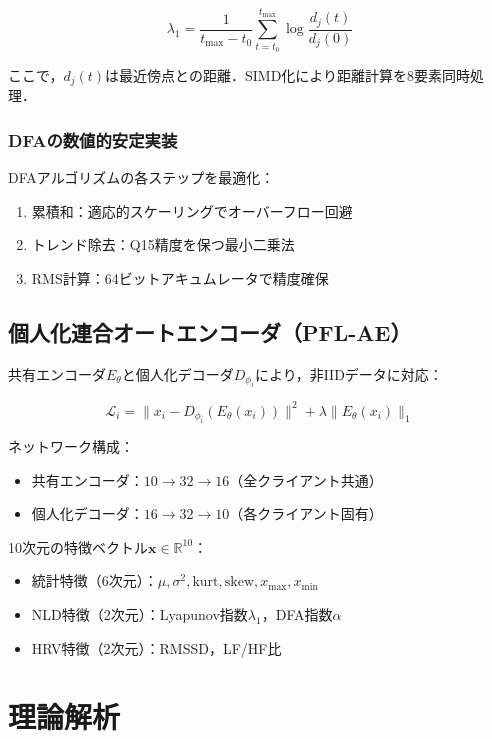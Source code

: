 \documentclass[10pt,twocolumn]{article}
\begin{document}
\begin{CJK}{UTF8}{min}
\begin{equation}
\lambda_1 = \frac{1}{t_{\max} - t_0} \sum_{t=t_0}^{t_{\max}} \log \frac{d_j(t)}{d_j(0)}
\end{equation}

ここで，$d_j(t)$は最近傍点との距離．SIMD化により距離計算を8要素同時処理．

\subsubsection{DFAの数値的安定実装}
DFAアルゴリズムの各ステップを最適化：

\begin{enumerate}
\item 累積和：適応的スケーリングでオーバーフロー回避
\item トレンド除去：Q15精度を保つ最小二乗法
\item RMS計算：64ビットアキュムレータで精度確保
\end{enumerate}

\subsection{個人化連合オートエンコーダ（PFL-AE）}

共有エンコーダ$E_{\theta}$と個人化デコーダ$D_{\phi_i}$により，非IIDデータに対応：

\begin{equation}
\mathcal{L}_i = \|x_i - D_{\phi_i}(E_{\theta}(x_i))\|^2 + \lambda\|E_{\theta}(x_i)\|_1
\end{equation}

ネットワーク構成：
\begin{itemize}
\item 共有エンコーダ：$10 \rightarrow 32 \rightarrow 16$（全クライアント共通）
\item 個人化デコーダ：$16 \rightarrow 32 \rightarrow 10$（各クライアント固有）
\end{itemize}

10次元の特徴ベクトル$\mathbf{x} \in \mathbb{R}^{10}$：
\begin{itemize}
\item 統計特徴（6次元）：$\mu, \sigma^2, \text{kurt}, \text{skew}, x_{\max}, x_{\min}$
\item NLD特徴（2次元）：Lyapunov指数$\lambda_1$，DFA指数$\alpha$
\item HRV特徴（2次元）：RMSSD，LF/HF比
\end{itemize}

\section{理論解析}


\end{CJK}
\end{document}
